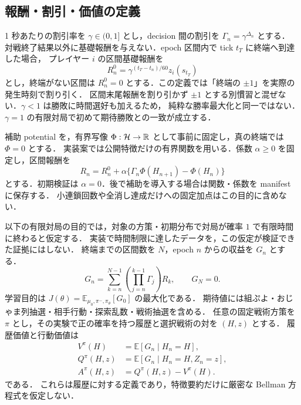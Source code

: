 \subsection{報酬・割引・価値の定義}
1 秒あたりの割引率を $\gamma\in(0,1]$ とし，decision 間の割引を $\Gamma_n=\gamma^{\Delta_n}$ とする．
対戦終了結果以外に基礎報酬を与えない．epoch 区間内で tick $t_T$ に終端へ到達した場合，
プレイヤー $i$ の区間基礎報酬を
\begin{equation}\label{eq:base-reward}
 R_n^0=\gamma^{(t_T-t_n)/60}z_i(s_{t_T})
\end{equation}
とし，終端がない区間は $R_n^0=0$ とする．この定義では「終端の $\pm1$」を実際の発生時刻で割り引く．
区間末尾報酬を割り引かず $\pm1$ とする別慣習と混ぜない．$\gamma<1$ は勝敗に時間選好も加えるため，
純粋な勝率最大化と同一ではない．$\gamma=1$ の有限対局で初めて期待勝敗との一致が成立する．

補助 potential を，有界写像 $\Phi:\mathcal H\to\mathbb{R}$ として事前に固定し，真の終端では $\Phi=0$ とする．
実装案では公開特徴だけの有界関数を用いる．係数 $\alpha\ge0$ を固定し，区間報酬を
\begin{equation}\label{eq:potential}
 R_n=R_n^0+\alpha\{\Gamma_n\Phi(H_{n+1})-\Phi(H_n)\}
\end{equation}
とする．初期検証は $\alpha=0$．後で補助を導入する場合は関数・係数を manifest に保存する．
小連鎖回数や全消し達成だけへの固定加点はこの目的に含めない．

以下の有限対局の目的では，対象の方策・初期分布で対局が確率 $1$ で有限時間に終わると仮定する．
実装で時間制限に達したデータを，この仮定が検証できた証拠にはしない．
終端までの区間数を $N$，epoch $n$ からの収益を $G_n$ とする．
\begin{equation}\label{eq:return}
 G_n=\sum_{k=n}^{N-1}\left(\prod_{j=n}^{k-1}\Gamma_j\right)R_k,
 \qquad G_N=0.
\end{equation}
学習目的は $J(\theta)=\mathbb E_{\mu_0,\pi^-,\pi_\theta}[G_0]$ の最大化である．
期待値には組ぷよ・おじゃま列抽選・相手行動・探索乱数・戦術抽選を含める．
任意の固定戦術方策を $\pi$ とし，その実験で正の確率を持つ履歴と選択戦術の対を $(H,z)$ とする．
履歴価値と行動価値は
\begin{equation}\label{eq:value}
\begin{aligned}
 V^\pi(H)&=\mathbb E[G_n\mid H_n=H],\\
 Q^\pi(H,z)&=\mathbb E[G_n\mid H_n=H,Z_n=z],\\
 A^\pi(H,z)&=Q^\pi(H,z)-V^\pi(H).
\end{aligned}
\end{equation}
である．
これらは履歴に対する定義であり，特徴要約だけに厳密な Bellman 方程式を仮定しない．


